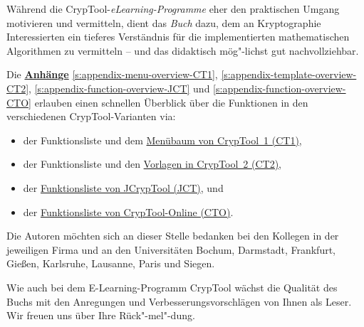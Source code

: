 Während die CrypTool-\textit{eLearning-Programme} eher den
praktischen Umgang motivieren und vermitteln, dient das \textit{Buch} dazu,
dem an Kryptographie Interessierten ein tieferes Verständnis für die
implementierten mathematischen Algorithmen zu vermitteln -- und das
didaktisch mög"-lichst gut nachvollziehbar.

Die \hyperlink{appendix-start}\textbf{Anhänge}
\ref{s:appendix-menu-overview-CT1},
\ref{s:appendix-template-overview-CT2},
\ref{s:appendix-function-overview-JCT} und
\ref{s:appendix-function-overview-CTO}
erlauben einen schnellen Überblick über die Funktionen in den verschiedenen
CrypTool-Varianten via:
\begin{itemize}
  \item der Funktionsliste und
        dem \hyperlink{appendix-menu-overview-CT1}
                      {Menübaum von CrypTool~1 (CT1)},
  \item der Funktionsliste und
        den \hyperlink{appendix-template-overview-CT2}
                      {Vorlagen in CrypTool~2 (CT2)},
  \item der \hyperlink{appendix-function-overview-JCT}
                      {Funktionsliste von JCrypTool (JCT)}, und
  \item der \hyperlink{appendix-function-overview-CTO}
                      {Funktionsliste von CrypTool-Online (CTO)}.
\end{itemize}

Die Autoren möchten sich an dieser Stelle bedanken bei den Kollegen
in der jeweiligen Firma und an den Universitäten Bochum, Darmstadt, Frankfurt,
Gießen, Karlsruhe, Lausanne, Paris und Siegen.

\enlargethispage{0.5cm}
Wie auch bei dem E-Learning-Programm CrypTool wächst
die Qualität des Buchs mit den Anregungen und Verbesserungsvorschlägen
von Ihnen als Leser. Wir freuen uns über Ihre Rück"-mel"-dung.



